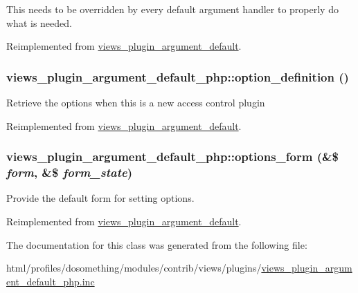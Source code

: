 This needs to be overridden by every default argument handler to properly do what is needed. 

Reimplemented from \hyperlink{classviews__plugin__argument__default_a8e67864f4a1ce20b12bc82afe1acd255}{views\_\-plugin\_\-argument\_\-default}.\hypertarget{classviews__plugin__argument__default__php_ab5a278f9c6318deee971fd12ef18b604}{
\subsubsection[{option\_\-definition}]{\setlength{\rightskip}{0pt plus 5cm}views\_\-plugin\_\-argument\_\-default\_\-php::option\_\-definition ()}}
\label{classviews__plugin__argument__default__php_ab5a278f9c6318deee971fd12ef18b604}
Retrieve the options when this is a new access control plugin 

Reimplemented from \hyperlink{classviews__plugin__argument__default_ac3a58218880857bc009d4617fab2241b}{views\_\-plugin\_\-argument\_\-default}.\hypertarget{classviews__plugin__argument__default__php_adfe529cfc20d02c8e2de13451dfa7071}{
\subsubsection[{options\_\-form}]{\setlength{\rightskip}{0pt plus 5cm}views\_\-plugin\_\-argument\_\-default\_\-php::options\_\-form (\&\$ {\em form}, \/  \&\$ {\em form\_\-state})}}
\label{classviews__plugin__argument__default__php_adfe529cfc20d02c8e2de13451dfa7071}
Provide the default form for setting options. 

Reimplemented from \hyperlink{classviews__plugin__argument__default_a9bc59dae448f4c35d422bc54d0879930}{views\_\-plugin\_\-argument\_\-default}.

The documentation for this class was generated from the following file:\begin{DoxyCompactItemize}
\item 
html/profiles/dosomething/modules/contrib/views/plugins/\hyperlink{views__plugin__argument__default__php_8inc}{views\_\-plugin\_\-argument\_\-default\_\-php.inc}\end{DoxyCompactItemize}
